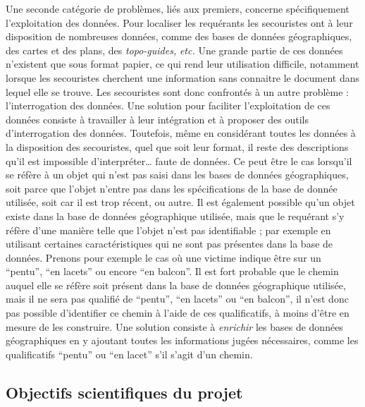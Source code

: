 Une seconde catégorie de problèmes, liés aux premiers, concerne
spécifiquement l'exploitation des données. Pour localiser les
requérants les secouristes ont à leur disposition de nombreuses
données, comme des bases de données géographiques, des cartes et des
plans, des \emph{topo-guides,} \emph{etc.} Une grande partie de ces
données n'existent que sous format papier, ce qui rend leur
utilisation difficile, notamment lorsque les secouristes cherchent une
information sans connaitre le document dans lequel elle se trouve. Les
secouristes sont donc confrontés à un autre problème : l'interrogation
des données. Une solution pour faciliter l'exploitation de ces données
consiste à travailler à leur intégration et à proposer des outils
d'interrogation des données. Toutefois, même en considérant toutes les
données à la disposition des secouristes, quel que soit leur format,
il reste des descriptions qu'il est impossible d'interpréter… faute de
données. Ce peut être le cas lorsqu'il se réfère à un objet qui n'est
pas saisi dans les bases de données géographiques, soit parce que
l'objet n'entre pas dans les spécifications de la base de donnée
utilisée, soit car il est trop récent, ou autre. Il est également
possible qu'un objet existe dans la base de données géographique
utilisée, mais que le requérant s'y réfère d'une manière telle que
l'objet n'est pas identifiable ; par exemple en utilisant certaines
caractéristiques qui ne sont pas présentes dans la base de
données. Prenons pour exemple le cas où une victime indique être sur
un \enquote{pentu}, \enquote{en lacets} ou encore \enquote{en
  balcon}. Il est fort probable que le chemin auquel elle se réfère
soit présent dans la base de données géographique utilisée, mais il ne
sera pas qualifié de \enquote{pentu}, \enquote{en lacets} ou
\enquote{en balcon}, il n'est donc pas possible d'identifier ce chemin
à l'aide de ces qualificatifs, à moins d'être en mesure de les
construire. Une solution consiste à \emph{enrichir} les bases de
données géographiques en y ajoutant toutes les informations jugées
nécessaires, comme les qualificatifs \enquote{pentu} ou \enquote{en
  lacet} s'il s'agit d'un chemin.

\subsection{Objectifs scientifiques du projet}
\label{subsec:1-2-3}

